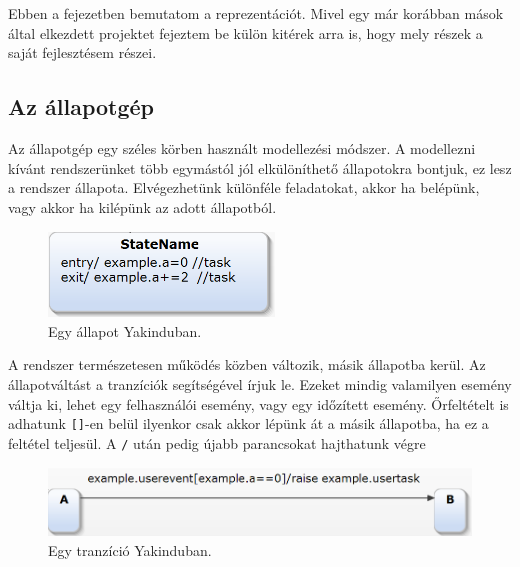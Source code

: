 \chapter{\pojo}
\label{sec:pojochapter}

Ebben a fejezetben bemutatom a {\thetaSc} reprezentációt. Mivel egy már korábban mások által elkezdett projektet fejeztem be külön kitérek arra is, hogy mely részek a saját fejlesztésem részei.
\section{Az állapotgép}
Az állapotgép egy széles körben használt modellezési módszer. A modellezni kívánt rendszerünket több egymástól jól elkülöníthető állapotokra bontjuk, ez lesz a rendszer állapota. Elvégezhetünk különféle feladatokat, akkor ha belépünk, vagy akkor ha kilépünk az adott állapotból.

\begin{figure} [!ht]
\centering
\includegraphics[width=60mm, keepaspectratio]{figures/state.png}
\caption{\label{fig:state}Egy állapot Yakinduban.}
\end{figure}

A rendszer természetesen működés közben változik, másik állapotba kerül. Az állapotváltást a tranzíciók segítségével írjuk le. Ezeket mindig valamilyen esemény váltja ki, lehet egy felhasználói esemény, vagy egy időzített esemény. Őrfeltételt is adhatunk \verb+[]+-en belül ilyenkor csak akkor lépünk át a másik állapotba, ha ez a feltétel teljesül. A \verb+/+ után pedig újabb parancsokat hajthatunk végre

\begin{figure} [!ht]
 	\centering
 	\includegraphics[width=150mm, keepaspectratio]{figures/transition.png}
 	\caption{\label{fig:transition}Egy tranzíció Yakinduban.}
\end{figure}

